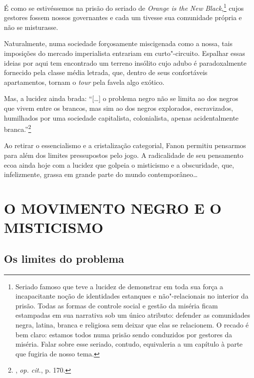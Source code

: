 É como se estivéssemos na prisão do seriado de \emph{Orange is the New
Black},\footnote{Seriado famoso que teve a lucidez de demonstrar em toda
  sua força a incapacitante noção de identidades estanques e
  não"-relacionais no interior da prisão. Todas as formas de controle
  social e gestão da miséria ficam estampadas em sua narrativa sob um
  único atributo: defender as comunidades negra, latina, branca e
  religiosa sem deixar que elas se relacionem. O recado é bem claro:
  estamos todos numa prisão sendo conduzidos por gestores da miséria.
  Falar sobre esse seriado, contudo, equivaleria a um capítulo à parte
  que fugiria de nosso tema.} cujos gestores fossem nossos
governantes e cada um tivesse sua comunidade própria e não se
misturasse.

Naturalmente, numa sociedade forçosamente miscigenada como a nossa, tais
imposições do mercado imperialista entrariam em curto"-circuito.
Espalhar essas ideias por aqui
tem encontrado um terreno insólito cujo adubo é paradoxalmente fornecido
pela classe média letrada, que, dentro de seus confortáveis
apartamentos, tornam o \emph{tour} pela favela algo exótico.

Mas, a lucidez ainda brada:
``{[}\ldots{}{]} o problema negro não
se limita ao dos negros que vivem entre os brancos, mas sim ao dos
negros explorados, escravizados, humilhados por uma sociedade
capitalista, colonialista, apenas acidentalmente branca.''\footnote{,
  \emph{op. cit.}, p. 170.}

Ao retirar o essencialismo e a cristalização categorial, Fanon permitiu
pensarmos para além dos limites pressupostos pelo jogo. A radicalidade
de seu pensamento ecoa ainda hoje com a lucidez que golpeia o misticismo
e a obscuridade, que, infelizmente, grassa em grande parte do mundo
contemporâneo\ldots{}

\part{O MOVIMENTO NEGRO E O MISTICISMO}
\removeepigraph

\chapter{Os limites do problema}

